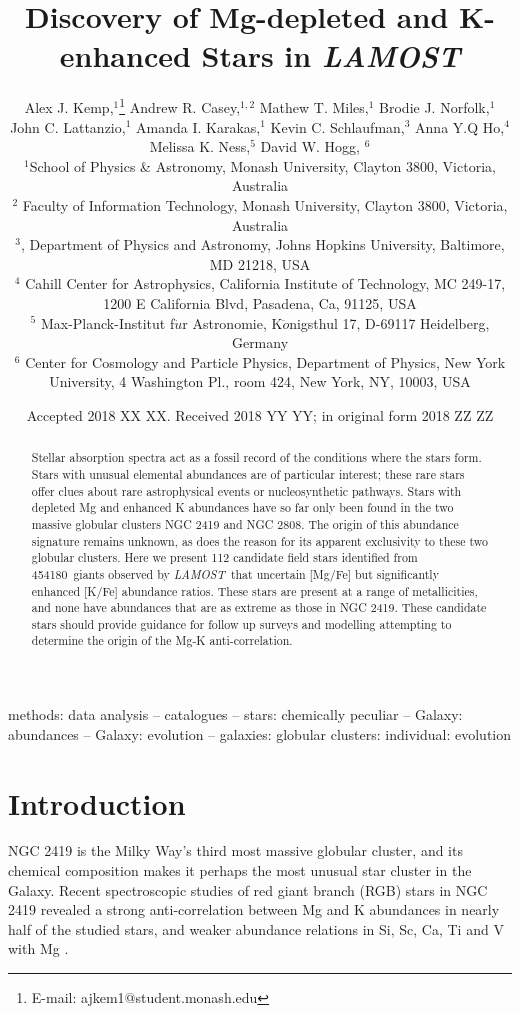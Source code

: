 \documentclass[a4paper,fleqn,usenatbib]{mnras}
\title[Mg-K anti-correlation in LAMOST]{Discovery of Mg-depleted and K-enhanced Stars in \textit{LAMOST}}
\author[Kemp et al.]{
Alex J. Kemp,$^{1}$\thanks{E-mail: ajkem1@student.monash.edu}
Andrew R. Casey,$^{1,2}$
Mathew T. Miles,$^{1}$
Brodie J. Norfolk,$^{1}$\newauthor
John C. Lattanzio,$^{1}$
Amanda I. Karakas,$^{1}$
Kevin C. Schlaufman,$^{3}$\newauthor
Anna Y.Q Ho,$^{4}$
Melissa K. Ness,$^{5}$
David W. Hogg, $^{6}$
\\
$^{1}$School of Physics \& Astronomy, Monash University, Clayton 3800, Victoria, Australia\\
$^{2}$ Faculty of Information Technology, Monash University, Clayton 3800, Victoria, Australia\\
$^{3}$, Department of Physics and Astronomy, Johns Hopkins University, Baltimore, MD 21218, USA\\
$^{4}$ Cahill Center for Astrophysics, California Institute of Technology, MC 249-17, 1200 E California Blvd, Pasadena, Ca, 91125, USA\\
$^{5}$ Max-Planck-Institut f$\ddot{u}$r Astronomie, K$\ddot{o}$nigsthul 17, D-69117 Heidelberg, Germany\\
$^{6}$ Center for Cosmology and Particle Physics, Department of Physics, New York University, 4 Washington Pl., room 424, New York, NY, 10003, USA\\
}
\date{Accepted 2018 XX XX. Received 2018 YY YY; in original form 2018 ZZ ZZ}
\newcommand{\LamostGiants}{454180}
\newcommand{\project}[1]{\emph{#1}}
\newcommand{\lamost}{\project{LAMOST}}
\begin{document}
\label{firstpage}
\pagerange{\pageref{firstpage}--\pageref{lastpage}}
\maketitle

\begin{abstract}

Stellar absorption spectra act as a fossil record of the conditions where the stars form. Stars with unusual elemental abundances are of particular interest; these rare stars offer clues about rare astrophysical events or nucleosynthetic pathways. Stars with  depleted Mg and enhanced K abundances have so far only been found in the two massive globular clusters NGC 2419 and NGC 2808. The origin of this abundance signature remains unknown, as does the reason for its apparent exclusivity to these two globular clusters. Here we present 112 candidate field stars identified from \LamostGiants \ giants observed by \lamost \ that uncertain [Mg/Fe] but significantly enhanced [K/Fe] abundance ratios. These stars are present at a range of metallicities, and none have abundances that are as extreme as those in NGC 2419. These candidate stars should provide guidance for follow up surveys and modelling attempting to determine the origin of the Mg-K anti-correlation.



\end{abstract}

\begin{keywords}
methods: data analysis -- catalogues -- stars: chemically peculiar -- Galaxy: abundances -- Galaxy: evolution -- galaxies: globular clusters: individual: evolution
\end{keywords}



\section{Introduction}
\label{sec:intro}
NGC 2419 is the Milky Way's third most massive globular cluster, and its chemical composition makes it perhaps the most unusual star cluster in the Galaxy. Recent spectroscopic studies of red giant branch (RGB) stars in NGC 2419 revealed a strong anti-correlation between Mg and K abundances in nearly half of the studied stars, and weaker abundance relations in Si, Sc, Ca, Ti and V with Mg \citep{mucciarelli2012,cohenkirby2012}.
\end{document}
